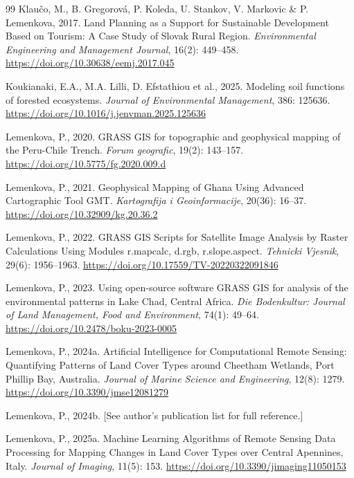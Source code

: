 \documentclass[sn-mathphys-num]{sn-jnl}
\begin{document}
\begin{thebibliography}{99}
Klau\v{c}o, M., B. Gregorov\'{a}, P. Koleda, U. Stankov, V. Markovic \&
P. Lemenkova, 2017.
Land Planning as a Support for Sustainable Development Based on Tourism: A
Case Study of Slovak Rural Region.
\textit{Environmental Engineering and Management Journal},
16(2): 449--458.
\url{https://doi.org/10.30638/eemj.2017.045}

Koukianaki, E.A., M.A. Lilli, D. Efstathiou et al., 2025.
Modeling soil functions of forested ecosystems.
\textit{Journal of Environmental Management}, 386: 125636.
\url{https://doi.org/10.1016/j.jenvman.2025.125636}

Lemenkova, P., 2020.
GRASS GIS for topographic and geophysical mapping of the Peru-Chile Trench.
\textit{Forum geografic}, 19(2): 143--157.
\url{https://doi.org/10.5775/fg.2020.009.d}

Lemenkova, P., 2021.
Geophysical Mapping of Ghana Using Advanced Cartographic Tool GMT\@.
\textit{Kartografija i Geoinformacije}, 20(36): 16--37.
\url{https://doi.org/10.32909/kg.20.36.2}

Lemenkova, P., 2022.
GRASS GIS Scripts for Satellite Image Analysis by Raster Calculations Using
Modules r.mapcalc, d.rgb, r.slope.aspect.
\textit{Tehnicki Vjesnik}, 29(6): 1956--1963.
\url{https://doi.org/10.17559/TV-20220322091846}

Lemenkova, P., 2023.
Using open-source software GRASS GIS for analysis of the environmental
patterns in Lake Chad, Central Africa.
\textit{Die Bodenkultur: Journal of Land Management, Food and Environment},
74(1): 49--64.
\url{https://doi.org/10.2478/boku-2023-0005}

Lemenkova, P., 2024a.
Artificial Intelligence for Computational Remote Sensing: Quantifying
Patterns of Land Cover Types around Cheetham Wetlands, Port Phillip Bay,
Australia.
\textit{Journal of Marine Science and Engineering}, 12(8): 1279.
\url{https://doi.org/10.3390/jmse12081279}

Lemenkova, P., 2024b.
[See author's publication list for full reference.]

Lemenkova, P., 2025a.
Machine Learning Algorithms of Remote Sensing Data Processing for Mapping
Changes in Land Cover Types over Central Apennines, Italy.
\textit{Journal of Imaging}, 11(5): 153.
\url{https://doi.org/10.3390/jimaging11050153}


\end{thebibliography}
\end{document}
